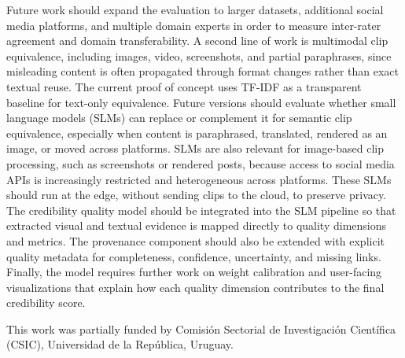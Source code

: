 \documentclass[sigconf, nonacm]{acmart}
\begin{document}
Future work should expand the evaluation to larger datasets, additional social
media platforms, and multiple domain experts in order to measure inter-rater
agreement and domain transferability. A second line of work is multimodal clip
equivalence, including images, video, screenshots, and partial paraphrases, since
misleading content is often propagated through format changes rather than exact
textual reuse. The current proof of concept uses TF-IDF as a transparent baseline
for text-only equivalence. Future versions should evaluate whether small language
models (SLMs) can replace or complement it for semantic clip equivalence,
especially when content is paraphrased, translated, rendered as an image, or
moved across platforms. SLMs are also relevant for image-based clip processing,
such as screenshots or rendered posts, because access to social media APIs is
increasingly restricted and heterogeneous across platforms. These SLMs should run
at the edge, without sending clips to the cloud, to preserve privacy. The
credibility quality model should be integrated into the SLM pipeline so that
extracted visual and textual evidence is mapped directly to quality dimensions
and metrics. The provenance component should also be extended with explicit
quality metadata for completeness, confidence, uncertainty, and missing links.
Finally, the model requires further work on weight calibration and user-facing
visualizations that explain how each quality dimension contributes to the final
credibility score.

\begin{acks}
This work was partially funded by Comisión Sectorial de Investigación Científica (CSIC), Universidad de la República, Uruguay.
\end{acks}



\end{document}
